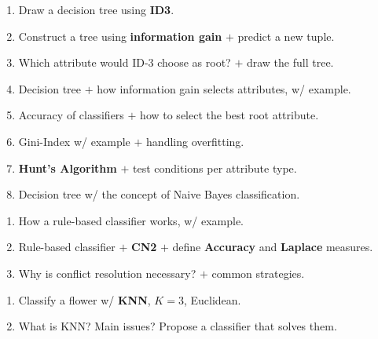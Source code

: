 \begin{enumerate}[start=4]
  \item {} Draw a decision tree using \textbf{ID3}. \hfill {} 
  \item {} Construct a tree using \textbf{information gain} $+$ predict a new tuple. \hfill {} 
  \item {} Which attribute would ID-3 choose as root? $+$ draw the full tree. \hfill {} 
  \item \tS{} Decision tree $+$ how information gain selects attributes, w/ example. \hfill {} 
  \item Accuracy of classifiers $+$ how to select the best root attribute. \hfill {} 
  \item {} Gini-Index w/ example $+$ handling overfitting. \hfill {}   
  \item {} \textbf{Hunt's Algorithm} $+$ test conditions per attribute type. \hfill {} 
  \item {} Decision tree w/ the concept of Naive Bayes classification. \hfill {} 
\end{enumerate}

\begin{enumerate}[start=12]
  \item {} How a rule-based classifier works, w/ example. \hfill {}   
  \item {} Rule-based classifier $+$ \textbf{CN2} $+$ define \textbf{Accuracy} and
        \textbf{Laplace} measures. \hfill {} 
  \item {} Why is conflict resolution necessary? $+$ common strategies. \hfill {} 
\end{enumerate}

\begin{enumerate}[start=15]
  \item {} Classify a flower w/ \textbf{KNN}, $K=3$, Euclidean. \hfill {} 
  \item {} What is KNN? Main issues? Propose a classifier that solves them. \hfill {} 
\end{enumerate}

